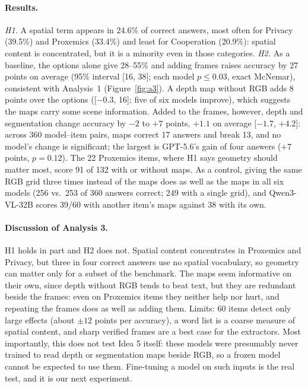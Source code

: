 \paragraph{Results.} \emph{H1.} A spatial term appears in 24.6\% of correct answers, most often for Privacy (39.5\%) and Proxemics (33.4\%) and least for Cooperation (20.9\%): spatial content is concentrated, but it is a minority even in those categories. \emph{H2.} As a baseline, the options alone give 28--55\% and adding frames raises accuracy by 27 points on average (95\% interval [16, 38]; each model $p\le0.03$, exact McNemar), consistent with Analysis~1 (Figure~\ref{fig:a3}). A depth map without RGB adds 8 points over the options ([$-0.3$, 16]; five of six models improve), which suggests the maps carry some scene information. Added to the frames, however, depth and segmentation change accuracy by $-2$ to $+7$ points, $+1.1$ on average [$-1.7$, $+4.2$]: across 360 model--item pairs, maps correct 17 answers and break 13, and no model's change is significant; the largest is GPT-5.6's gain of four answers ($+7$ points, $p=0.12$). The 22 Proxemics items, where H1 says geometry should matter most, score 91 of 132 with or without maps. As a control, giving the same RGB grid three times instead of the maps does as well as the maps in all six models (256 vs.\ 253 of 360 answers correct; 249 with a single grid), and Qwen3-VL-32B scores 39/60 with another item's maps against 38 with its own.

\paragraph{Discussion of Analysis 3.} H1 holds in part and H2 does not. Spatial content concentrates in Proxemics and Privacy, but three in four correct answers use no spatial vocabulary, so geometry can matter only for a subset of the benchmark. The maps seem informative on their own, since depth without RGB tends to beat text, but they are redundant beside the frames: even on Proxemics items they neither help nor hurt, and repeating the frames does as well as adding them. Limits: 60 items detect only large effects (about $\pm12$ points per accuracy), a word list is a coarse measure of spatial content, and sharp verified frames are a best case for the extractors. Most importantly, this does not test Idea 5 itself: these models were presumably never trained to read depth or segmentation maps beside RGB, so a frozen model cannot be expected to use them. Fine-tuning a model on such inputs is the real test, and it is our next experiment.
